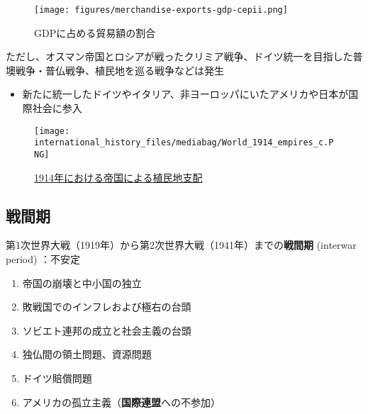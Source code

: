 \documentclass[
  xelatex,
  ja=standard]{bxjsarticle}
\providecommand{\tightlist}{%
  \setlength{\itemsep}{0pt}\setlength{\parskip}{0pt}}\usepackage{longtable,booktabs,array}
\begin{document}
\begin{figure}[htpb]

{\centering \texttt{[image: figures/merchandise-exports-gdp-cepii.png]}

}

\caption{GDPに占める貿易額の割合}

\end{figure}

ただし、オスマン帝国とロシアが戦ったクリミア戦争、ドイツ統一を目指した普墺戦争・普仏戦争、植民地を巡る戦争などは発生

\begin{itemize}
\tightlist
\item
  新たに統一したドイツやイタリア、非ヨーロッパにいたアメリカや日本が国際社会に参入
\end{itemize}

\begin{figure}[htpb]

{\centering \texttt{[image: international\_history\_files/mediabag/World\_1914\_empires\_c.PNG]}

}

\caption{\href{https://commons.wikimedia.org/wiki/File:World_1914_empires_colonies_territory.PNG}{1914年における帝国による植民地支配}}

\end{figure}

\hypertarget{ux6226ux9593ux671f}{%
\subsection{戦間期}\label{ux6226ux9593ux671f}}

第1次世界大戦（1919年）から第2次世界大戦（1941年）までの\textbf{戦間期}
(interwar period) ：不安定

\begin{enumerate}
\def\labelenumi{\arabic{enumi}.}
\tightlist
\item
  帝国の崩壊と中小国の独立
\item
  敗戦国でのインフレおよび極右の台頭
\item
  ソビエト連邦の成立と社会主義の台頭
\item
  独仏間の領土問題、資源問題
\item
  ドイツ賠償問題
\item
  アメリカの孤立主義（\textbf{国際連盟}への不参加）
\end{enumerate}
\end{document}
